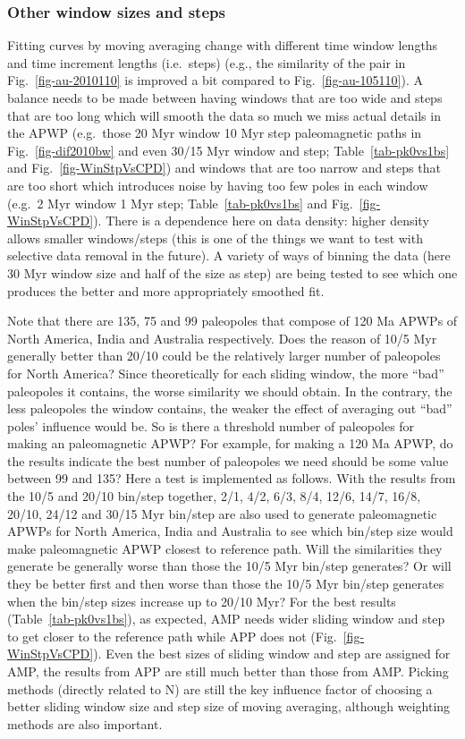 \subsubsection{Other window sizes and steps}

Fitting curves by moving averaging change with different time window lengths and
time increment lengths (i.e.\ steps) (e.g., the similarity of the pair in
Fig.~\ref{fig-au-2010110} is improved a bit compared to
Fig.~\ref{fig-au-105110}). A balance needs to be made between having windows
that are too wide and steps that are too long which will smooth the data so much
we miss actual details in the APWP (e.g.\ those 20 Myr window 10 Myr step
paleomagnetic paths in Fig.~\ref{fig-dif2010bw} and even 30/15 Myr window and
step; Table~\ref{tab-pk0vs1bs} and Fig.~\ref{fig-WinStpVsCPD}) and windows that
are too narrow and steps that are too short which introduces noise by having too
few poles in each window (e.g.\ 2 Myr window 1 Myr step;
Table~\ref{tab-pk0vs1bs} and Fig.~\ref{fig-WinStpVsCPD}). There is a dependence
here on data density: higher density allows smaller windows/steps (this is one
of the things we want to test with selective data removal in the future). A
variety of ways of binning the data (here 30 Myr window size and
half of the size as step) are being tested to see which one produces the better
and more appropriately smoothed fit.

Note that there are 135, 75 and 99 paleopoles that compose of 120 Ma
APWPs of North America, India and Australia respectively. Does the reason of
10/5 Myr generally better than 20/10 could be the relatively larger number of
paleopoles for North America? Since theoretically for each sliding window, the
more ``bad'' paleopoles it contains, the worse similarity we should obtain. In
the contrary, the less paleopoles the window contains, the weaker the effect of
averaging out ``bad'' poles' influence would be. So is there a threshold number
of paleopoles for making an paleomagnetic APWP\@? For example, for making a
120 Ma APWP, do the results indicate the best number of paleopoles
we need should be some value between 99 and 135? Here a test is implemented as
follows. With the results from the 10/5 and 20/10 bin/step together, 2/1, 4/2,
6/3, 8/4, 12/6, 14/7, 16/8, 20/10, 24/12 and 30/15 Myr bin/step are also used to
generate paleomagnetic APWPs for North America, India and Australia to see which
bin/step size would make paleomagnetic APWP closest to reference path. Will the
similarities they generate be generally worse than those the 10/5 Myr bin/step
generates? Or will they be better first and then worse than those the 10/5 Myr
bin/step generates when the bin/step sizes increase up to 20/10 Myr? For the
best results (Table~\ref{tab-pk0vs1bs}), as expected, AMP needs wider sliding
window and step to get closer to the reference path while APP does not
(Fig.~\ref{fig-WinStpVsCPD}). Even the best sizes of sliding window and step are
assigned for AMP, the results from APP are still much better than those from
AMP\@. Picking methods (directly related to N) are still the key influence
factor of choosing a better sliding window size and step size of moving
averaging, although weighting methods are also important.

